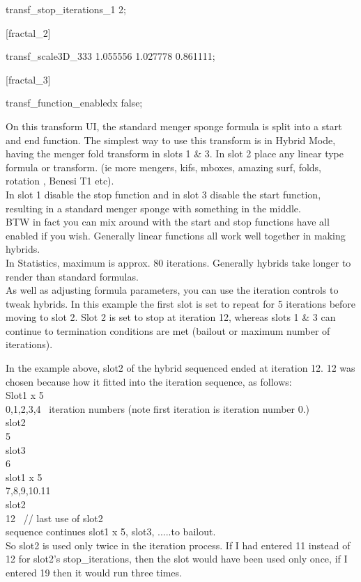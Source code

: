 transf\_stop\_iterations\_1 2;

{[}fractal\_2{]}

transf\_scale3D\_333 1.055556 1.027778 0.861111;

{[}fractal\_3{]}

transf\_function\_enabledx false;

On this transform UI, the standard menger sponge formula is split into a start
and end function. The simplest way to use this transform is in Hybrid Mode,
having the menger fold transform in slots 1 \& 3. In slot 2 place any linear
type formula or transform. (ie more mengers, kifs, mboxes, amazing surf, folds,
rotation , Benesi T1 etc).\\[2\baselineskip]In slot 1 disable the stop function
and in slot 3 disable the start function, resulting in a standard menger sponge
with something in the middle.\\[2\baselineskip]BTW in fact you can mix around
with the start and stop functions have all enabled if you wish. Generally linear
functions all work well together in making hybrids.\\[2\baselineskip]In
Statistics, maximum is approx. 80 iterations. Generally hybrids take longer to
render than standard formulas.\\ As well as adjusting formula parameters, you
can use the iteration controls to tweak hybrids. In this example the first slot
is set to repeat for 5 iterations before moving to slot 2. Slot 2 is set to stop
at iteration 12, whereas slots 1 \& 3 can continue to termination conditions are
met (bailout or maximum number of iterations).

In the example above, slot2 of the hybrid sequenced ended at iteration 12. 12
was chosen because how it fitted into the iteration sequence, as follows:\\
Slot1 x 5\\ 0,1,2,3,4~ iteration numbers (note first iteration is iteration
number 0.)\\ slot2\\ 5\\ slot3~\\ 6\\ slot1 x 5\\ 7,8,9,10.11\\ slot2\\ 12~ //
last use of slot2\\ \hspace*{0.333em}sequence continues slot1 x 5, slot3,
.....to bailout.\\ So slot2 is used only twice in the iteration process. If I
had entered 11 instead of 12 for slot2's stop\_iterations, then the slot would
have been used only once, if I entered 19 then it would run three times.

